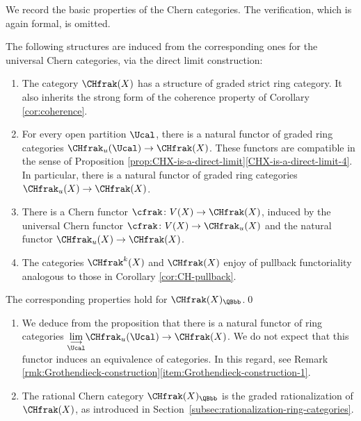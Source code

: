 We record the basic properties of the Chern categories. The verification, which is again formal, is omitted.
\begin{proposition}\label{prop:formal-properties-CH-quasi-compact}
The following structures are induced from the corresponding ones for the universal Chern categories, via the direct limit construction:
\begin{enumerate}
\item\label{item:formal-properties-CH-quasi-compact-1} The category $\CHfrak(X)$ has a structure of graded strict ring category. It also inherits the strong form of the coherence property of Corollary \ref{cor:coherence}.
\item\label{item:formal-properties-CH-quasi-compact-2} For every open partition $\Ucal$, there is a natural functor of graded ring categories $\CHfrak_{u}(\Ucal)\to\CHfrak(X)$. These functors are compatible in the sense of Proposition \ref{prop:CHX-is-a-direct-limit}\eqref{CHX-is-a-direct-limit-4}. In particular, there is a natural functor of graded ring categories $\CHfrak_{u}(X)\to\CHfrak(X)$.
\item\label{item:formal-properties-CH-quasi-compact-5} There is a Chern functor $\cfrak\colon V(X)\to\CHfrak(X)$, induced by the universal Chern functor $\cfrak\colon V(X)\to\CHfrak_{u}(X)$ and the natural functor $\CHfrak_{u}(X)\to\CHfrak(X)$.
\item\label{item:formal-properties-CH-quasi-compact-6} The categories $\CHfrak^{k}(X)$ and $\CHfrak(X)$ enjoy of pullback functoriality analogous to those in Corollary \ref{cor:CH-pullback}.
\end{enumerate}
The corresponding properties hold for $\CHfrak(X)_{\QBbb}$.\qed
\end{proposition}

\skpt
\begin{remark}
\begin{enumerate}
\item We deduce from the proposition that there is a natural functor of ring categories $\underset{\substack{\longrightarrow\\ \Ucal}}{\lim}\CHfrak_{u}(\Ucal)\to\CHfrak(X)$. We do not expect that this functor induces an equivalence of categories. In this regard, see Remark \eqref{rmk:Grothendieck-construction}\eqref{item:Grothendieck-construction-1}.
\item The rational Chern category $\CHfrak(X)_{\QBbb}$ is the graded rationalization of $\CHfrak(X)$, as introduced in Section~\ref{subsec:rationalization-ring-categories}.
\end{enumerate}
\end{remark}

